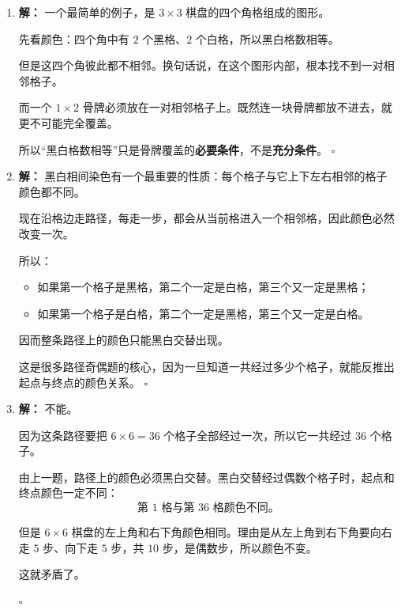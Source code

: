 \documentclass[11pt,a4paper,fontset=fandol]{ctexart}
\theoremstyle{formalexample}
\newenvironment{solution}{\par\noindent\textbf{解：}}{\hfill$\square$\par}
\begin{document}
\begin{enumerate}
\begin{solution}
  这个例子说明：黑白格数相等时，有时能覆盖；但这只是“没有立刻矛盾”，并不自动说明一切图形都一定能覆盖。
  \end{solution}

  \item \begin{solution}
  一个最简单的例子，是 $3\times 3$ 棋盘的四个角格组成的图形。

  先看颜色：四个角中有 $2$ 个黑格、$2$ 个白格，所以黑白格数相等。

  但是这四个角彼此都不相邻。换句话说，在这个图形内部，根本找不到一对相邻格子。

  而一个 $1\times 2$ 骨牌必须放在一对相邻格子上。既然连一块骨牌都放不进去，就更不可能完全覆盖。

  所以“黑白格数相等”只是骨牌覆盖的\textbf{必要条件}，不是\textbf{充分条件}。
  \end{solution}

  \item \begin{solution}
  黑白相间染色有一个最重要的性质：每个格子与它上下左右相邻的格子颜色都不同。

  现在沿格边走路径，每走一步，都会从当前格进入一个相邻格，因此颜色必然改变一次。

  所以：
  \begin{itemize}
    \item 如果第一个格子是黑格，第二个一定是白格，第三个又一定是黑格；
    \item 如果第一个格子是白格，第二个一定是黑格，第三个又一定是白格。
  \end{itemize}

  因而整条路径上的颜色只能黑白交替出现。

  这是很多路径奇偶题的核心，因为一旦知道一共经过多少个格子，就能反推出起点与终点的颜色关系。
  \end{solution}

  \item \begin{solution}
  不能。

  因为这条路径要把 $6\times 6=36$ 个格子全部经过一次，所以它一共经过 $36$ 个格子。

  由上一题，路径上的颜色必须黑白交替。黑白交替经过偶数个格子时，起点和终点颜色一定不同：
  \[
  \text{第 1 格与第 36 格颜色不同。}
  \]

  但是 $6\times 6$ 棋盘的左上角和右下角颜色相同。理由是从左上角到右下角要向右走 $5$ 步、向下走 $5$ 步，共 $10$ 步，是偶数步，所以颜色不变。

  这就矛盾了。


\end{solution}
\end{enumerate}
\end{document}
